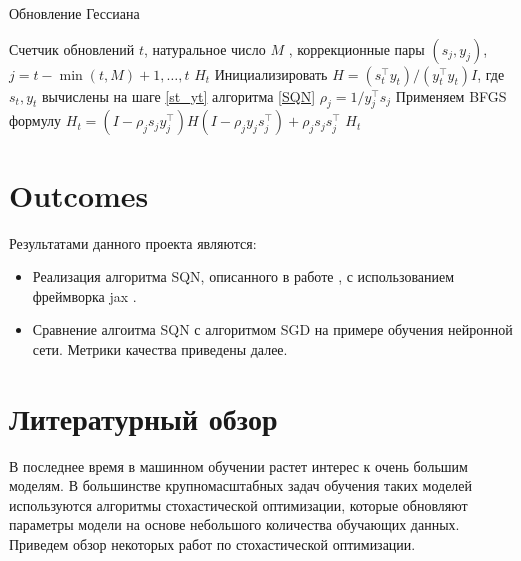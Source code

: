 \documentclass[]{scrartcl}
\begin{document}
\begin{algorithm}[h!]
	\caption{Обновление Гессиана}
	\label{hess_updating}
	\begin{algorithmic}[1]
	\REQUIRE Счетчик обновлений $t$, натуральное число $M$ , коррекционные пары $(s_j, y_j)$,\\$j = t - \min(t, M) + 1, \ldots, t$
	\ENSURE $H_t$
	\STATE Инициализировать $H = (s_t^\top y_t)/(y_t^\top y_t)I$, где $s_t, y_t$ вычислены на шаге \ref{st_yt} алгоритма \ref{SQN}
		\STATE $\rho_j = 1/y_j^\top s_j$
		\STATE Применяем  BFGS формулу $H_t = (I - \rho_js_jy_j^\top)H(I - \rho_jy_js_j^\top) + \rho_js_js_j^\top$
	\ENDFOR
	\RETURN $H_t$
	\end{algorithmic}
\end{algorithm}



\section{Outcomes}
Результатами данного проекта являются:
\begin{itemize}
\item Реализация алгоритма SQN, описанного в работе \cite{journals/siamjo/ByrdHNS16}, с использованием фреймворка jax \cite{jax2018github}.

\item Сравнение алгоитма SQN \cite{journals/siamjo/ByrdHNS16} с алгоритмом SGD на примере обучения нейронной сети. Метрики качества приведены далее.
\end{itemize}



\section{Литературный обзор}

В последнее время в машинном обучении растет интерес к очень большим моделям. В большинстве крупномасштабных задач обучения таких моделей используются алгоритмы стохастической оптимизации, которые обновляют параметры модели на основе небольшого количества обучающих данных. Приведем обзор некоторых работ по стохастической оптимизации.
\end{document}
